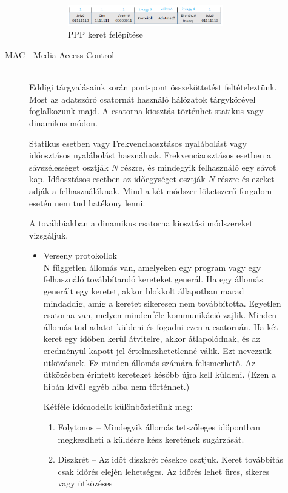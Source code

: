 \documentclass[margin=0px]{article}
\begin{document}
\begin{description}
\begin{description}
\begin{itemize}
                          \begin{figure}[H]
                              \centering
                              \includegraphics[width=0.8\textwidth]{img/ppp_keret.png}
                              \caption{PPP keret felépítése}
                          \end{figure}
                \end{itemize}
            \item[MAC - Media Access Control] \hfill \\
                Eddigi tárgyalásaink során pont-pont összeköttetést feltételeztünk. Most az adatszóró csatornát használó hálózatok tárgykörével foglalkozunk majd. A csatorna kiosztás történhet statikus vagy dinamikus módon.

                Statikus esetben vagy Frekvenciaosztásos nyalábolást vagy időosztásos nyalábolást használnak. Frekvenciaosztásos esetben a sávszélességet osztják $N$ részre, és mindegyik felhasználó egy sávot kap. Időosztásos esetben az időegységet osztják $N$ részre és ezeket adják a felhasználóknak. Mind a két módszer löketszerű forgalom esetén nem tud hatékony lenni.

                A továbbiakban a dinamikus csatorna kiosztási módszereket vizsgáljuk.
                \begin{itemize}
                    \item Verseny protokollok \\
                          N független állomás van, amelyeken egy program vagy egy felhasználó továbbítandó kereteket generál. Ha egy állomás generált egy keretet, akkor blokkolt állapotban marad mindaddig, amíg a keretet sikeresen nem továbbította. Egyetlen csatorna van, melyen mindenféle kommunikáció zajlik. Minden állomás tud adatot küldeni és fogadni ezen a csatornán. Ha két keret egy időben kerül átvitelre, akkor átlapolódnak, és az eredményül kapott jel értelmezhetetlenné válik. Ezt nevezzük ütközésnek. Ez minden állomás számára felismerhető. Az ütközésben érintett kereteket később újra kell küldeni. (Ezen a hibán kívül egyéb hiba nem történhet.)

                          Kétféle időmodellt különböztetünk meg:
                          \begin{enumerate}
                              \item Folytonos – Mindegyik állomás tetszőleges időpontban megkezdheti a küldésre kész keretének sugárzását.
                              \item Diszkrét – Az időt diszkrét résekre osztjuk. Keret továbbítás csak időrés elején lehetséges. Az időrés lehet üres, sikeres vagy ütközéses
                          \end{enumerate}


\end{itemize}
\end{description}
\end{description}
\end{document}
